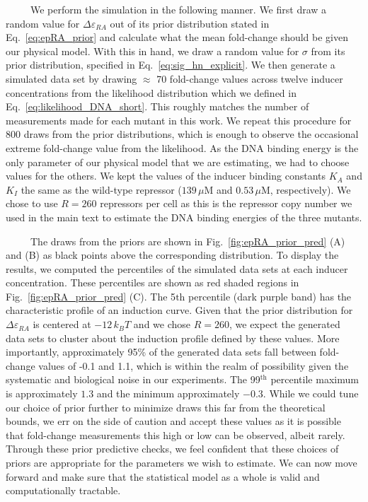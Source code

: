 \documentclass[12pt]{caltech_thesis}
\begin{document}
~~~~~We perform the simulation in the following manner. We first draw a
random value for \(\Delta\varepsilon_{RA}\) out of its prior
distribution stated in Eq.~\ref{eq:epRA_prior} and calculate what the
mean fold-change should be given our physical model. With this in hand,
we draw a random value for \(\sigma\) from its prior distribution,
specified in Eq.~\ref{eq:sig_hn_explicit}. We then generate a simulated
data set by drawing \(\approx\) 70 fold-change values across twelve
inducer concentrations from the likelihood distribution which we defined
in Eq.~\ref{eq:likelihood_DNA_short}. This roughly matches the number of
measurements made for each mutant in this work. We repeat this procedure
for 800 draws from the prior distributions, which is enough to observe
the occasional extreme fold-change value from the likelihood. As the DNA
binding energy is the only parameter of our physical model that we are
estimating, we had to choose values for the others. We kept the values
of the inducer binding constants \(K_A\) and \(K_I\) the same as the
wild-type repressor (\(139\,\mu\)M and \(0.53\,\mu\)M, respectively). We
chose to use \(R=260\) repressors per cell as this is the repressor copy
number we used in the main text to estimate the DNA binding energies of
the three mutants.

~~~~~The draws from the priors are shown in
Fig.~\ref{fig:epRA_prior_pred} (A) and (B) as black points above the
corresponding distribution. To display the results, we computed the
percentiles of the simulated data sets at each inducer concentration.
These percentiles are shown as red shaded regions in
Fig.~\ref{fig:epRA_prior_pred} (C). The 5\(\text{th}\) percentile (dark
purple band) has the characteristic profile of an induction curve. Given
that the prior distribution for \(\Delta\varepsilon_{RA}\) is centered
at \(-12\, k_BT\) and we chose \(R = 260\), we expect the generated data
sets to cluster about the induction profile defined by these values.
More importantly, approximately 95\% of the generated data sets fall
between fold-change values of -0.1 and 1.1, which is within the realm of
possibility given the systematic and biological noise in our
experiments. The 99\(^\text{th}\) percentile maximum is approximately
\(1.3\) and the minimum approximately \(-0.3\). While we could tune our
choice of prior further to minimize draws this far from the theoretical
bounds, we err on the side of caution and accept these values as it is
possible that fold-change measurements this high or low can be observed,
albeit rarely. Through these prior predictive checks, we feel confident
that these choices of priors are appropriate for the parameters we wish
to estimate. We can now move forward and make sure that the statistical
model as a whole is valid and computationally tractable.
\end{document}
